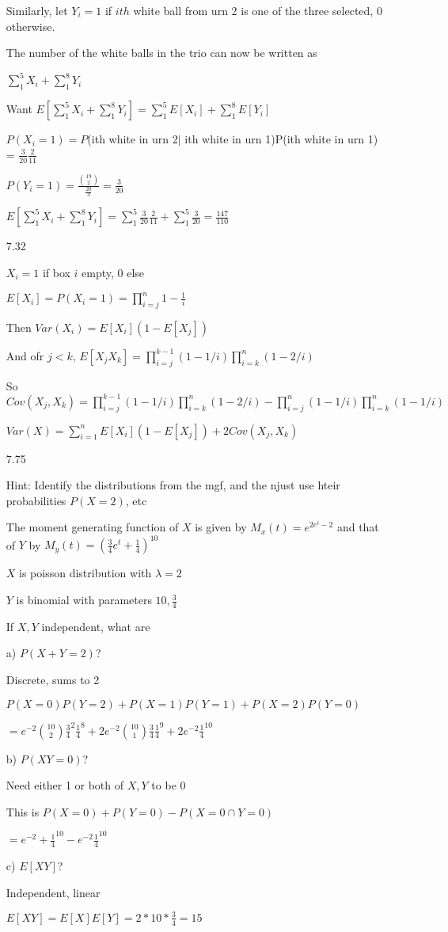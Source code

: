 \documentclass[11pt]{article}
\begin{document}
\begin{itemize}
		Similarly, let $Y_i = 1$ if $ith$ white ball from urn 2 is one of the three selected, 0 otherwise.

		The number of the white balls in the trio can now be written as 

		$\sum_1^5 X_i + \sum_1^8 Y_i$

		Want $E[\sum_1^5 X_i + \sum_1^8 Y_i] = \sum_1^5 E[X_i] + \sum_1^8 E[Y_i]$

		$P(X_i = 1) = P$(ith white in urn 2$|$ ith white in urn 1)P(ith white in urn 1) = $\frac{3}{20} \frac{2}{11}$

		$P(Y_i = 1) = \frac{\binom{19}{2}}{\frac{20}{3}} = \frac{3}{20}$

		$E[\sum_1^5 X_i + \sum_1^8 Y_i] = \sum_1^5 \frac{3}{20} \frac{2}{11} + \sum_1^5 \frac{3}{20} = \frac{147}{110}$

	\item[7.32]

		$X_i = 1$ if box $i$ empty, 0 else

		$E[X_i] = P(X_i = 1) = \prod_{i=j}^n 1- \frac{1}{i}$

		Then $Var(X_i) = E[X_i](1-E[X_j])$

		And ofr $j < k$, $E[X_j X_k] = \prod_{i=j}^{k-1} (1 - 1/i) \prod_{i=k}^{n} (1-2/i)$

		So $Cov(X_j, X_k) = \prod_{i=j}^{k-1} (1 - 1/i) \prod_{i=k}^{n} (1-2/i) - \prod_{i=j}^{n} (1 - 1/i) \prod_{i=k}^{n} (1 - 1/i)$

		$Var(X) = \sum_{i=1}^{n} E[X_i](1-E[X_j]) + 2Cov(X_j, X_k)$

	\item[7.75]

		Hint: Identify the distributions from the mgf, and the njust use hteir probabilities $P(X=2)$, etc		

		The moment generating function of $X$ is given by $M_x(t) = e^{2e^t -2}$ and that of $Y$ by $M_y (t) = (\frac{3}{4} e^t + \frac{1}{4})^{10}$

		$X$ is poisson distribution with $\lambda = 2$

		$Y$ is binomial with parameters $10, \frac{3}{4}$

		If $X,Y$ independent, what are

		a) $P(X + Y = 2)$?

		Discrete, sums to 2

		$P(X = 0)P(Y = 2) + P(X=1)P(Y=1) + P(X=2)P(Y=0)$

		$=e^{-2} \binom{10}{2} \frac{3}{4}^2 \frac{1}{4}^8 + 2e^{-2} \binom{10}{1} \frac{3}{4}\frac{1}{4}^9 + 2e^{-2}\frac{1}{4}^{10}$

		b) $P(XY = 0)$?

		Need either 1 or both of $X,Y$ to be 0

		This is $P(X = 0) + P(Y = 0) - P(X=0\cap Y = 0)$

		$=e^{-2} + \frac{1}{4}^{10} - e^{-2}\frac{1}{4}^{10}$

		c) $E[XY]$?

		Independent, linear

		$E[XY] = E[X]E[Y] = 2*10*\frac{3}{4} = 15$

\end{itemize}
\end{document}
